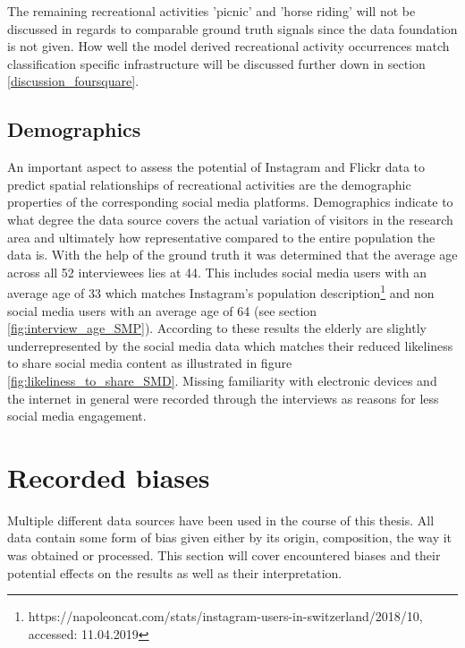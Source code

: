 The remaining recreational activities 'picnic' and 'horse riding' will not be discussed in regards to comparable ground truth signals since the data foundation is not given. How well the model derived recreational activity occurrences match classification specific infrastructure will be discussed further down in section \ref{discussion_foursquare}.\\

\subsection{Demographics}
An important aspect to assess the potential of Instagram and Flickr data to predict spatial relationships of recreational activities are the demographic properties of the corresponding social media platforms. Demographics indicate to what degree the data source covers the actual variation of visitors in the research area and ultimately how representative compared to the entire population the data is. With the help of the ground truth it was determined that the average age across all 52 interviewees lies at 44. This includes social media users with an average age of 33 which matches Instagram's population description\footnote{https://napoleoncat.com/stats/instagram-users-in-switzerland/2018/10, accessed: 11.04.2019} and non social media users with an average age of 64 (see section \ref{fig:interview_age_SMP}). According to these results the elderly are slightly underrepresented by the social media data which matches their reduced likeliness to share social media content as illustrated in figure \ref{fig:likeliness_to_share_SMD}. Missing familiarity with electronic devices and the internet in general were recorded through the interviews as reasons for less social media engagement. 

\section{Recorded biases} \label{discussion_rec_bias}
Multiple different data sources have been used in the course of this thesis. All data contain some form of bias given either by its origin, composition, the way it was obtained or processed. 
This section will cover encountered biases and their potential effects on the results as well as their interpretation.

